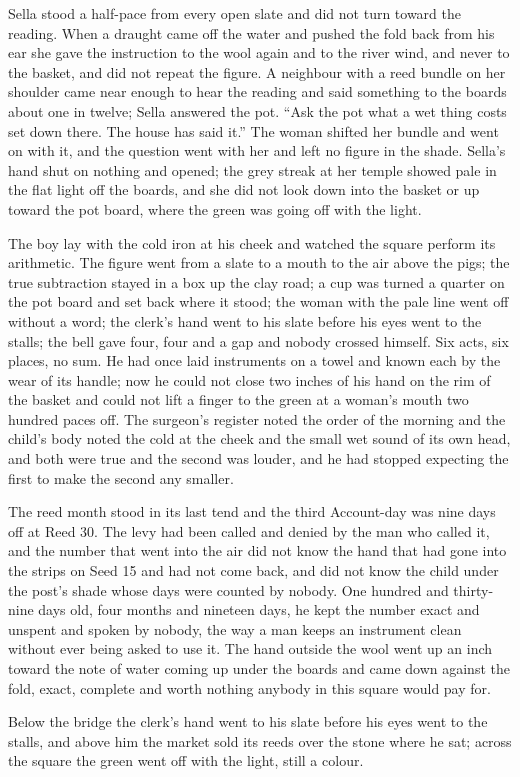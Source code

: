\scenebreak

Sella stood a half-pace from every open slate and did not turn toward the reading. When a draught came off the water and pushed the fold back from his ear she gave the instruction to the wool again and to the river wind, and never to the basket, and did not repeat the figure. A neighbour with a reed bundle on her shoulder came near enough to hear the reading and said something to the boards about one in twelve; Sella answered the pot. “Ask the pot what a wet thing costs set down there. The house has said it.” The woman shifted her bundle and went on with it, and the question went with her and left no figure in the shade. Sella's hand shut on nothing and opened; the grey streak at her temple showed pale in the flat light off the boards, and she did not look down into the basket or up toward the pot board, where the green was going off with the light.

The boy lay with the cold iron at his cheek and watched the square perform its arithmetic. The figure went from a slate to a mouth to the air above the pigs; the true subtraction stayed in a box up the clay road; a cup was turned a quarter on the pot board and set back where it stood; the woman with the pale line went off without a word; the clerk's hand went to his slate before his eyes went to the stalls; the bell gave four, four and a gap and nobody crossed himself. Six acts, six places, no sum. He had once laid instruments on a towel and known each by the wear of its handle; now he could not close two inches of his hand on the rim of the basket and could not lift a finger to the green at a woman's mouth two hundred paces off. The surgeon's register noted the order of the morning and the child's body noted the cold at the cheek and the small wet sound of its own head, and both were true and the second was louder, and he had stopped expecting the first to make the second any smaller.

The reed month stood in its last tend and the third Account-day was nine days off at Reed 30. The levy had been called and denied by the man who called it, and the number that went into the air did not know the hand that had gone into the strips on Seed 15 and had not come back, and did not know the child under the post's shade whose days were counted by nobody. One hundred and thirty-nine days old, four months and nineteen days, he kept the number exact and unspent and spoken by nobody, the way a man keeps an instrument clean without ever being asked to use it. The hand outside the wool went up an inch toward the note of water coming up under the boards and came down against the fold, exact, complete and worth nothing anybody in this square would pay for.

Below the bridge the clerk's hand went to his slate before his eyes went to the stalls, and above him the market sold its reeds over the stone where he sat; across the square the green went off with the light, still a colour.

